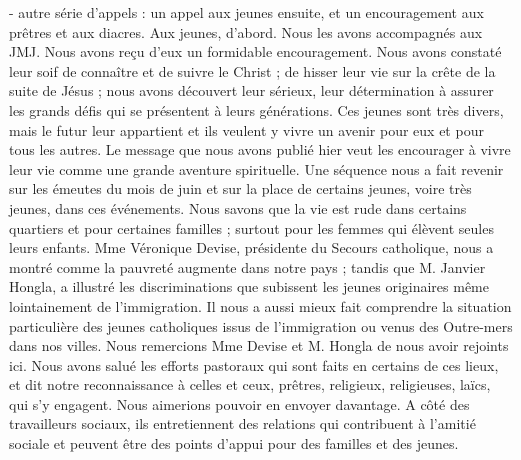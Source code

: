 \begin{itemize}
-	autre série d’appels : un appel aux jeunes ensuite, et un encouragement aux prêtres et aux diacres. Aux jeunes, d’abord. Nous les avons accompagnés aux JMJ. Nous avons reçu d’eux un formidable encouragement. Nous avons constaté leur soif de connaître et de suivre le Christ ; de hisser leur vie sur la crête de la suite de Jésus ; nous avons découvert leur sérieux, leur détermination à assurer les grands défis qui se présentent à leurs générations. Ces jeunes sont très divers, mais le futur leur appartient et ils veulent y vivre un avenir pour eux et pour tous les autres. Le message que nous avons publié hier veut les encourager à vivre leur vie comme une grande aventure spirituelle. Une séquence nous a fait revenir sur les émeutes du mois de juin et sur la place de certains jeunes, voire très jeunes, dans ces événements. Nous savons que la vie est rude dans certains quartiers et pour certaines familles ; surtout pour les femmes qui élèvent seules leurs enfants. Mme Véronique Devise, présidente du Secours catholique, nous a montré comme la pauvreté augmente dans notre pays ; tandis que M. Janvier Hongla, a illustré les discriminations que subissent les jeunes originaires même lointainement
de l’immigration. Il nous a aussi mieux fait comprendre la situation particulière des jeunes catholiques issus de l’immigration ou venus des Outre-mers dans nos villes. Nous remercions Mme Devise et M. Hongla de nous avoir rejoints ici. Nous avons salué les efforts pastoraux qui sont faits en certains de ces lieux, et dit notre reconnaissance à celles et ceux, prêtres, religieux, religieuses, laïcs, qui s’y engagent. Nous aimerions pouvoir en envoyer davantage. A côté des travailleurs sociaux, ils entretiennent des relations qui contribuent à l’amitié sociale et peuvent être des points d’appui pour des familles et des jeunes.

\end{itemize}
